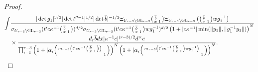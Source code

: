 \documentclass[12pt]{amsart}
\theoremstyle{remark}
\numberwithin{equation}{section}
\newcommand{\GL}{\mathrm{GL}}
\theoremstyle{definition}
\newenvironment{psmatrix}
  {\left(\begin{smallmatrix}}
  {\end{smallmatrix}\right)}
\numberwithin{equation}{subsection}
\newcommand{\norm}[1]{\lVert#1\rVert}
\begin{document}
\begin{proof}
\begin{align}
\begin{split}
\int&\frac{|\det g_1|^{3/2}|\det t''^{-1}|^{1/2}|\det \overline{b}|^{-1/2}\Xi_{U_{r-3} \backslash \GL_{r-3}}\begin{psmatrix} \overline{b} & \\ x & 1 \end{psmatrix}\Xi_{U_{r-3} \backslash \GL_{r-3}}\left(\begin{psmatrix} \overline{b} & \\ x & 1\end{psmatrix}wg_1^{-1}\right)}{\sigma_{U_{r-3} \backslash \GL_{r-3}}(t'c\kappa^{-1}\begin{psmatrix} \overline{b} & \\ x & 1 \end{psmatrix})^{d/2}\sigma_{U_{r-3} \backslash \GL_{r-3}}(t'c\kappa^{-1}\begin{psmatrix} \overline{b} & \\ x & 1 \end{psmatrix}wg_1^{-1})^{d/2}\left(1+|c\kappa^{-1}|\min(\norm{y_1},\norm{g_1^{-1}y_1})\right)^{N}}\\& \times
  \frac{d_r\overline{b}dx |\kappa^{-1}c|^{(r-3)/2} d^\times c}{ \prod_{i=1}^{r-3}\left(1+|\alpha_i\begin{psmatrix} m_{r-3}\left(t'c\kappa^{-1}\begin{psmatrix} \overline{b} & \\ x & 1 \end{psmatrix}\right) & \\ & 1 \end{psmatrix}\right)^{N}\left(1+|\alpha_i\begin{psmatrix} m_{r-3}\left(t'c\kappa^{-1}\begin{psmatrix} \overline{b} & \\ x & 1 \end{psmatrix}wg_1^{-1}\right) & \\ & 1 \end{psmatrix}\right)^{N}} .\end{split}
\end{align}


\end{proof}
\end{document}
